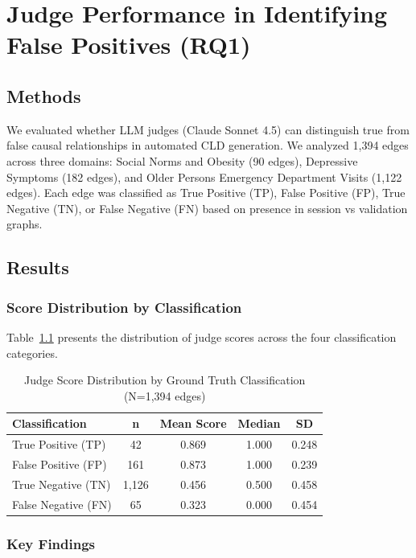 \chapter{Judge Performance in Identifying False Positives (RQ1)}
\label{ch:rq1_results}

\section{Methods}

We evaluated whether LLM judges (Claude Sonnet 4.5) can distinguish true from false causal relationships in automated CLD generation. We analyzed 1,394 edges across three domains: Social Norms and Obesity (90 edges), Depressive Symptoms (182 edges), and Older Persons Emergency Department Visits (1,122 edges). Each edge was classified as True Positive (TP), False Positive (FP), True Negative (TN), or False Negative (FN) based on presence in session vs validation graphs.

\section{Results}

\subsection{Score Distribution by Classification}

Table~\ref{tab:rq1_score_distribution} presents the distribution of judge scores across the four classification categories.

\begin{table}[h]
\centering
\caption{Judge Score Distribution by Ground Truth Classification (N=1,394 edges)}
\label{tab:rq1_score_distribution}
\begin{tabular}{lcccc}
\toprule
\textbf{Classification} & \textbf{n} & \textbf{Mean Score} & \textbf{Median} & \textbf{SD} \\
\midrule
True Positive (TP)  & 42    & 0.869 & 1.000 & 0.248 \\
False Positive (FP) & 161   & 0.873 & 1.000 & 0.239 \\
True Negative (TN)  & 1,126 & 0.456 & 0.500 & 0.458 \\
False Negative (FN) & 65    & 0.323 & 0.000 & 0.454 \\
\bottomrule
\end{tabular}
\end{table}

\subsection{Key Findings}


